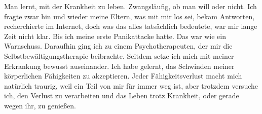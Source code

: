 \documentclass[fontsize=14pt,a4paper,headinclude,DIV=calc,automark]{scrbook}
\begin{document}
Man lernt, mit der Krankheit zu leben. Zwangsläufig, ob man will oder nicht. Ich fragte zwar hin und wieder meine Eltern, was mit mir los sei, bekam Antworten, recherchierte im Internet, doch was das alles tatsächlich bedeutete, war mir lange Zeit nicht klar. Bis ich meine erste Panikattacke hatte. Das war wie ein Warnschuss. Daraufhin ging ich zu einem Psychotherapeuten, der mir die Selbstbewältigungstherapie beibrachte. Seitdem setze ich mich mit meiner Erkrankung bewusst auseinander. Ich habe gelernt, das Schwinden meiner körperlichen Fähigkeiten zu akzeptieren. Jeder Fähigkeitsverlust macht mich natürlich traurig, weil ein Teil von mir für immer weg ist, aber trotzdem versuche ich, den Verlust zu verarbeiten und das Leben trotz Krankheit, oder gerade wegen ihr, zu genießen.
\end{document}
